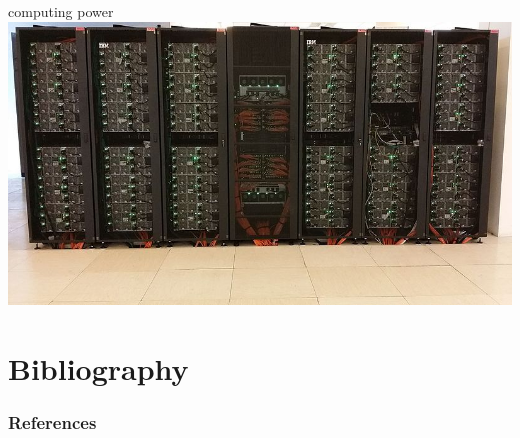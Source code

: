 \documentclass[12pt]{beamer}
\begin{document}
\begin{frame}
\begin{minipage}[t]{0.2\textwidth}
\end{minipage} 
\begin{minipage}[t]{0.2\textwidth}
\centering
computing power 
\\\vskip 0.2cm
\includegraphics[width=\textwidth]{Figures/supercomputer.jpg} 
\end{minipage} 
\end{frame}



\section{Bibliography}

\begin{frame}[allowframebreaks]
\frametitle{References}
\scriptsize
%   
   
   
\end{frame}
\end{document}
